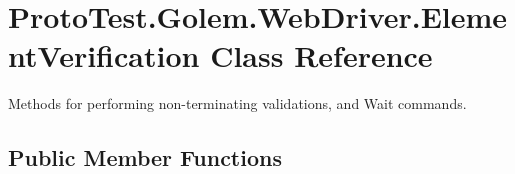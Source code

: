 \hypertarget{class_proto_test_1_1_golem_1_1_web_driver_1_1_element_verification}{\section{Proto\-Test.\-Golem.\-Web\-Driver.\-Element\-Verification Class Reference}
\label{class_proto_test_1_1_golem_1_1_web_driver_1_1_element_verification}
}


Methods for performing non-\/terminating validations, and Wait commands.  


\subsection*{Public Member Functions}
